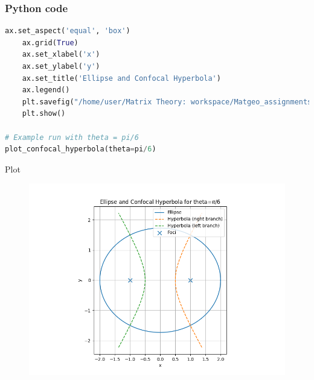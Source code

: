 \documentclass{beamer}
\begin{document}
\begin{frame}[fragile]
    \frametitle{Python code}
    \begin{lstlisting}[language=Python]
ax.set_aspect('equal', 'box')
    ax.grid(True)
    ax.set_xlabel('x')
    ax.set_ylabel('y')
    ax.set_title('Ellipse and Confocal Hyperbola')
    ax.legend()
    plt.savefig("/home/user/Matrix Theory: workspace/Matgeo_assignments/8.4.29/figs/Figure_1.png")
    plt.show()

# Example run with theta = pi/6
plot_confocal_hyperbola(theta=pi/6)

    \end{lstlisting}   
\end{frame}

\begin{frame}{Plot}
    \begin{figure}[H]
    \centering
    \includegraphics[width=0.8\columnwidth]{figs/Figure_1.png}
    \label{fig:1}
\end{figure}
\end{frame}
\end{document}
